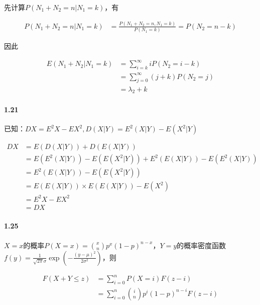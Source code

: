 \documentclass{article}
\begin{document}
    先计算$P(N_1 + N_2 = n | N_1 = k)$，有

    \begin{equation}
        \begin{aligned}
            P(N_1 + N_2 = n | N_1 = k) &= \frac{P(N_1 + N_2 = n, N_1 = k)}{P(N_1 = k)} = P(N_2 = n - k)
        \end{aligned}
    \end{equation}

    因此

    \begin{equation}
        \begin{aligned}
            E(N_1 + N_2 | N_1 = k) &= \sum_{i=k}^\infty iP(N_2 = i - k) \\
            &= \sum_{j=0}^\infty (j + k)P(N_2 = j) \\
            &= \lambda_2 + k
        \end{aligned}
    \end{equation}

    \paragraph*{1.21}

    已知：$DX = E^2X - EX^2, D(X|Y) = E^2(X|Y) - E(X^2|Y)$

    \begin{equation}
        \begin{aligned}
            DX &= E(D(X|Y)) + D(E(X|Y)) \\
            &= E(E^2(X|Y)) - E(E(X^2|Y)) + E^2(E(X|Y)) - E(E^2(X|Y)) \\
            &= E^2(E(X|Y)) - E(E(X^2|Y)) \\
            &= E(E(X|Y))\times E(E(X|Y)) - E(X^2) \\
            &= E^2X - EX^2 \\
            &= DX
        \end{aligned}
    \end{equation}

    \paragraph*{1.25} $X=x$的概率$P(X = x) = \binom{x}{n}p^{x}(1-p)^{n-x}$，$Y=y$的概率密度函数$f(y) = \frac{1}{\sqrt{2\pi}\sigma}\exp\left(-\frac{(y-\mu)^2}{2\sigma^2}\right)$，则

    \begin{equation}
        \begin{aligned}
            F(X + Y\leq z) &= \sum_{i=0}^n P(X=i)F(z - i) \\
            &= \sum_{i=0}^n \binom{i}{n}p^{i}(1-p)^{n-i} F(z - i)
        \end{aligned}
    \end{equation}
\end{document}
